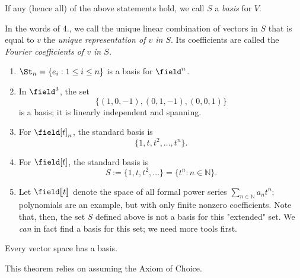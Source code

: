 \begin{definition}[Basis]
    If any (hence all) of the above statements hold, we call $S$ a \emph{basis} for $V$.

    In the words of 4., we call the unique linear combination of vectors in $S$ that is equal to $v$ the \emph{unique representation of $v$ in $S$}. Its coefficients are called the \emph{Fourier coefficients of $v$ in $S$.}
\end{definition}

\begin{example}
    \begin{enumerate}
        \item $\St_n = \{e_i : 1 \leq i \leq n\}$ is a basis for $\field^n$.
        \item In $\field^3$, the set \[
        \{(1, 0, -1), (0, 1, -1), (0,0,1)\}    
        \]
        is a basis; it is linearly independent and spanning.
        \item For $\field[t]_n$, the standard basis is \[
        \{1, t, t^2, \dots, t^n\}.
        \]
        \item For $\field[t]$, the standard basis is \[
        S := \{1, t, t^2, \dots\} = \{t^n : n \in \mathbb{N}\}.
        \]
        \item Let $\field[\![t]\!]$ denote the space of all formal power series $\sum_{n \in \mathbb{N}} a_n t^n$; polynomials are an example, but with only finite nonzero coefficients. Note that, then, the set $S$ defined above is not a basis for this "extended" set. We \emph{can} in fact find a basis for this set; we need more tools first.
    \end{enumerate}
\end{example}

\begin{theorem}\label{thm:vectorspacebases}
    Every vector space has a basis.
\end{theorem}

\begin{remark}
    This theorem relies on assuming the Axiom of Choice.
\end{remark}
